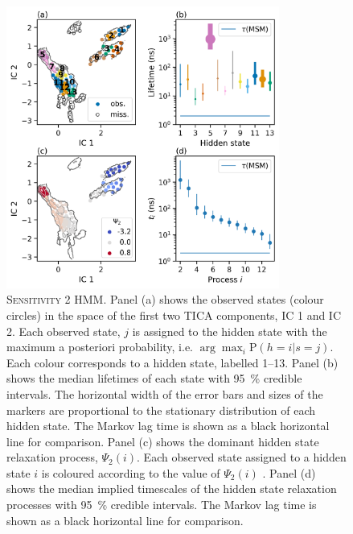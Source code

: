 \begin{figure}
    \centering
    \caption[Sensitivity 2 HMM]{\textsc{Sensitivity 2 HMM}.  Panel (a) shows the observed states (colour circles) in the space of the first two TICA components, IC 1 and IC 2. Each observed state, $j$ is assigned to the hidden state with the maximum a posteriori probability, i.e.  $\arg \max_{i} \mathrm{P}(h=i|s=j)$. Each colour corresponds to a hidden state, labelled \numrange{1}{13}. Panel (b) shows the median lifetimes of each state with \SI{95}{\percent} credible intervals. The horizontal width of the error bars and sizes of the markers are proportional to the stationary distribution of each hidden state. The Markov lag time is shown as a black horizontal line for comparison. Panel (c) shows the dominant hidden state relaxation process, $\Psi_{2}(i)$. Each observed state assigned to a hidden state $i$ is coloured according to the value of $\Psi_{2}(i)$ . Panel (d) shows the median implied timescales of the hidden state relaxation processes with \SI{95}{\percent} credible intervals. The Markov lag time is shown as a black horizontal line for comparison. }
    \label{fig:sensitivity_2_bhmm}
    \includegraphics[width=0.8\textwidth]{chapters/aadh/figures/sensitivity_2_hmm.png}
\end{figure}

